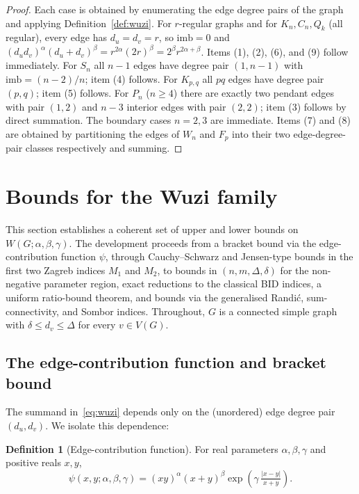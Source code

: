 \documentclass[a5paper, 10pt]{article}
\theoremstyle{plain}
\theoremstyle{remark}
\theoremstyle{definition}
\newtheorem{definition}{Definition}
\newcommand{\Wuzi}{W(G;\alpha,\beta,\gamma)}
\newcommand{\edgepsi}{\psi(x,y;\alpha,\beta,\gamma)}
\begin{document}
\begin{proof}
Each case is obtained by enumerating the edge degree pairs of the
graph and applying Definition~\ref{def:wuzi}. For $r$-regular
graphs and for $K_n, C_n, Q_k$ (all regular), every edge has
$d_u = d_v = r$, so $\mathrm{imb} = 0$ and
$(d_u d_v)^{\alpha}(d_u + d_v)^{\beta}
   = r^{2\alpha}(2r)^{\beta} = 2^{\beta} r^{2\alpha + \beta}$.
Items (1), (2), (6), and (9) follow immediately. For $S_n$ all
$n - 1$ edges have degree pair $(1, n - 1)$ with
$\mathrm{imb} = (n - 2)/n$; item (4) follows. For $K_{p, q}$ all
$pq$ edges have degree pair $(p, q)$; item (5) follows. For $P_n$
($n \ge 4$) there are exactly two pendant edges with pair $(1, 2)$
and $n - 3$ interior edges with pair $(2, 2)$; item (3) follows by
direct summation. The boundary cases $n = 2, 3$ are immediate.
Items (7) and (8) are obtained by partitioning the edges of $W_n$
and $F_p$ into their two edge-degree-pair classes respectively and
summing.
\end{proof}

\section{Bounds for the Wuzi family}\label{sec:bounds}

This section establishes a coherent set of upper and lower bounds
on $\Wuzi$. The development proceeds from a bracket bound via the
edge-contribution function $\psi$, through Cauchy--Schwarz and
Jensen-type bounds in the first two Zagreb indices $M_1$ and
$M_2$, to bounds in $(n, m, \Delta, \delta)$ for the non-negative
parameter region, exact reductions to the classical BID indices,
a uniform ratio-bound theorem, and bounds via the generalised
Randi\'c, sum-connectivity, and Sombor indices. Throughout, $G$
is a connected simple graph with $\delta \le d_v \le \Delta$ for
every $v \in V(G)$.

\subsection{The edge-contribution function and bracket bound}

The summand in~\eqref{eq:wuzi} depends only on the (unordered)
edge degree pair $(d_u, d_v)$. We isolate this dependence:

\begin{definition}[Edge-contribution function]\label{def:psi}
For real parameters $\alpha, \beta, \gamma$ and positive reals
$x, y$,
\begin{equation}\label{eq:psi}
\edgepsi = (xy)^{\alpha}(x + y)^{\beta}
\exp\!\left(\gamma\,\tfrac{|x - y|}{x + y}\right).
\end{equation}
\end{definition}
\end{document}

